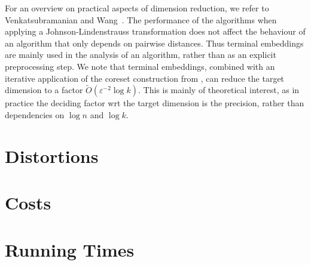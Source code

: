 For an overview on practical aspects of dimension reduction, we refer to Venkatsubramanian and Wang~\cite{VenkatasubramanianW11}. The performance of the algorithms when applying a Johnson-Lindenstrauss transformation does not affect the behaviour of an algorithm that only depends on pairwise distances. Thus terminal embeddings are mainly used in the analysis of an algorithm, rather than as an explicit preprocessing step.
We note that terminal embeddings, combined with an iterative application of the coreset construction from \cite{BravermanJKW21}, can reduce the target dimension to a factor $\tilde{O}(\varepsilon^{-2} \log k)$. This is mainly of theoretical interest, as in practice the deciding factor wrt the target dimension is the precision, rather than dependencies on $\log n$ and $\log k$.







\section{Distortions}
\label{sec:distortions-tables}







\section{Costs}
\label{sec:costs-tables}





\section{Running Times}
\label{sec:running-times-tables}





